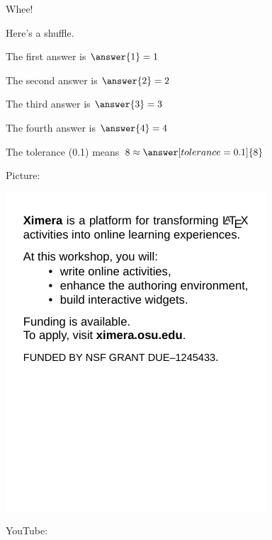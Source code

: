 \documentclass{ximera}
\begin{document}
Whee!

Here's a shuffle.

\begin{shuffle}
  \begin{problem}
    The first answer is $\answer{1} = 1$
  \end{problem}

  \begin{problem}
    The second answer is $\answer{2} = 2$
  \end{problem}

  \begin{problem}
    The third answer is $\answer{3} = 3$
  \end{problem}

  \begin{problem}
    The fourth answer is $\answer{4} = 4$

  \end{problem}
\end{shuffle}

\begin{problem}
  The tolerance (0.1) means $8 \approx \answer[tolerance=0.1]{8}$
\end{problem}

Picture:
\begin{image}
\includegraphics{flavor}
\end{image}

YouTube:
\end{document}
